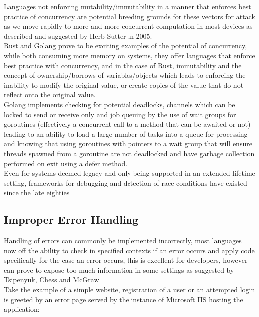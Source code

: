 \documentclass{IEEEtran}
\begin{document}
            Languages not enforcing mutability/immutability in a manner that enforces best practice 
            of concurrency are potential breeding grounds for these vectors for attack as we move 
            rapidly to more and more concurrent computation in most devices as described and 
            suggested by Herb Sutter\cite{Herb-Sutter} in 2005.
            \medskip
            \\
            Rust\cite{Rust} and Golang\cite{Golang} prove to be exciting examples of the potential
            of concurrency, while both consuming more memory on systems, they offer languages 
            that enforce best practice with concurrency\cite{sima2012secure}, and in the case of Rust, immutability and
            the concept of ownership/borrows of variables/objects which leads to enforcing the 
            inability to modify the original value, or create copies of the value that do not
            reflect onto the original value.
            \medskip
            \\            
            Golang implements checking for potential deadlocks, channels which can be locked to send or receive only and job queuing by the use of wait groups for goroutines
            (effectively a concurrent call to a method that can be awaited or not) leading to 
            an ability to load a large number of tasks into a queue for processing and knowing 
            that using goroutines with pointers to a wait group that will ensure threads spawned
            from a goroutine are not deadlocked and have garbage collection performed on exit 
            using a defer method.
            \medskip
            \\
            Even for systems deemed legacy and only being supported in an extended lifetime setting, 
            frameworks for debugging and detection of race conditions have existed since the 
            late eighties\cite{savage1997eraser}\cite{balasundaram1989compile}

        \subsection{Improper Error Handling}
            Handling of errors can commonly be implemented incorrectly, most languages now off the 
            ability to check in specified contexts if an error occurs and apply code specifically 
            for the case an error occurs, this is excellent for developers, however can prove to 
            expose too much information in some settings as suggested by Tsipenyuk, Chess and McGraw\cite{tsipenyuk2005seven}
            \medskip
            \\
            Take the example of a simple website, registration of a user or an attempted login is 
            greeted by an error page served by the instance of Microsoft IIS hosting the application:
\end{document}
